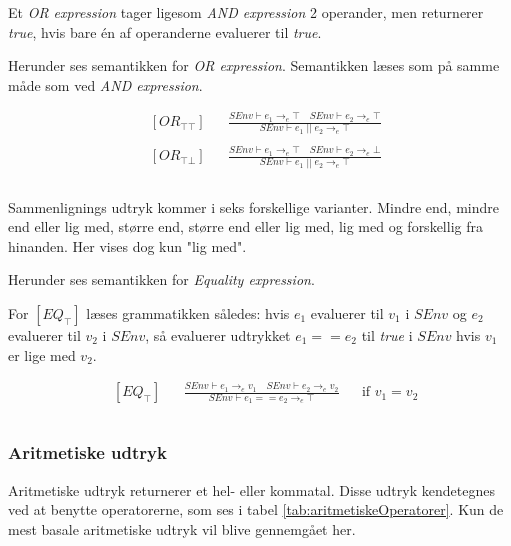 Et \textit{OR expression} tager ligesom \textit{AND expression} 2 operander, men returnerer \textit{true}, hvis bare én af operanderne evaluerer til \textit{true}. 

\noindent Herunder ses semantikken for \textit{OR expression}. Semantikken læses som på samme måde som ved \textit{AND expression}.

\begin{align*}
&[OR_{\top\top}] & &\frac{SEnv \vdash e_1 \rightarrow_e \top \quad SEnv \vdash e_2 \rightarrow_e \top}{SEnv \vdash e_1\; ||\; e_2 \rightarrow_e \top}\\\\
&[OR_{\top\bot}] & &\frac{SEnv \vdash e_1 \rightarrow_e \top \quad SEnv \vdash e_2 \rightarrow_e \bot}{SEnv \vdash e_1\; ||\; e_2 \rightarrow_e \top}\\\\
\end{align*}

Sammenlignings udtryk kommer i seks forskellige varianter. Mindre end, mindre end eller lig med, større end, større end eller lig med, lig med og forskellig fra hinanden. Her vises dog kun "lig med"\mbox{}.

\noindent Herunder ses semantikken for \textit{Equality expression}. 

\noindent For $[EQ_\top]$ læses grammatikken således: hvis $e_1$ evaluerer til $v_1$ i $SEnv$ og $e_2$ evaluerer til $v_2$ i $SEnv$, så evaluerer udtrykket $e_1 == e_2$ til \textit{true} i $SEnv$ hvis $v_1$ er lige med $v_2$.

\begin{align*}
&[EQ_\top] & &\frac{SEnv \vdash e_1 \rightarrow_e v_1 \quad SEnv \vdash e_2 \rightarrow_e v_2}{SEnv \vdash e_1 == e_2 \rightarrow_e \top} & &\text{if } v_1 = v_2\\\\
\end{align*}

\subsubsection{Aritmetiske udtryk}
Aritmetiske udtryk returnerer et hel- eller kommatal. Disse udtryk kendetegnes ved at benytte operatorerne, som ses i tabel \ref{tab:aritmetiskeOperatorer}. Kun de mest basale aritmetiske udtryk vil blive gennemgået her.


